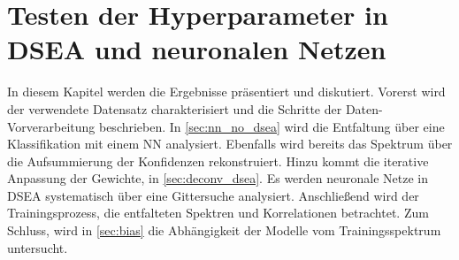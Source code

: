 \chapter{Testen der Hyperparameter in DSEA und neuronalen Netzen}
In diesem Kapitel werden die Ergebnisse präsentiert und diskutiert.
Vorerst wird der verwendete Datensatz charakterisiert und die Schritte der Daten-Vorverarbeitung beschrieben.
In \autoref{sec:nn_no_dsea} wird die Entfaltung über eine Klassifikation mit einem NN analysiert.
Ebenfalls wird bereits das Spektrum über die Aufsummierung der Konfidenzen rekonstruiert.
Hinzu kommt die iterative Anpassung der Gewichte, in \autoref{sec:deconv_dsea}.
Es werden neuronale Netze in DSEA systematisch über eine Gittersuche analysiert.
Anschließend wird der Trainingsprozess, die entfalteten Spektren und Korrelationen betrachtet.
Zum Schluss, wird in \autoref{sec:bias} die Abhängigkeit der Modelle vom Trainingsspektrum untersucht.

